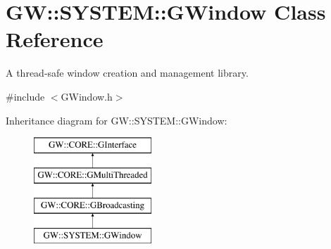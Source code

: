 \hypertarget{class_g_w_1_1_s_y_s_t_e_m_1_1_g_window}{}\section{GW\+:\+:S\+Y\+S\+T\+EM\+:\+:G\+Window Class Reference}
\label{class_g_w_1_1_s_y_s_t_e_m_1_1_g_window}


A thread-\/safe window creation and management library.  




{\ttfamily \#include $<$G\+Window.\+h$>$}

Inheritance diagram for GW\+:\+:S\+Y\+S\+T\+EM\+:\+:G\+Window\+:\begin{figure}[H]
\begin{center}
\leavevmode
\includegraphics[height=4.000000cm]{class_g_w_1_1_s_y_s_t_e_m_1_1_g_window}
\end{center}
\end{figure}

